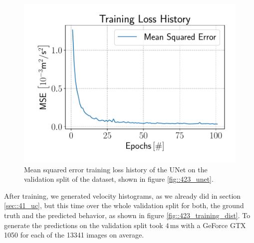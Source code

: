 \begin{figure}[h!]
	\centering
	\includegraphics[scale=.4]{chapters/04_experiments/02_autonomous_walking/05_07_19_loss_history.pdf}
	\caption{Mean squared error training loss history of the UNet on the validation split of the dataset, shown in figure \ref{fig::423_unet}.}
	\label{fig::423_loss}
\end{figure}
After training, we generated velocity histograms, as we already did in section \ref{sec::41_uc}, but this time over the whole validation split for both, the ground truth and the predicted behavior, as shown in figure \ref{fig::423_training_dist}. To generate the predictions on the validation split took $4\,\text{ms}$ with a GeForce GTX 1050 for each of the 13341 images on average.
